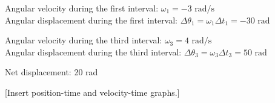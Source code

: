 Angular velocity during the first interval: $\omega_1=-3\mbox{ rad/s}$\\
Angular displacement during the first interval: $\Delta\theta_1=\omega_1\Delta{t_1}=-30\mbox{ rad}$

Angular velocity during the third interval: $\omega_3=4\mbox{ rad/s}$\\
Angular displacement during the third interval: $\Delta\theta_3=\omega_3\Delta{t_3}=50\mbox{ rad}$

Net displacement: 20 rad

[Insert position-time and velocity-time graphs.]


\clearpage
